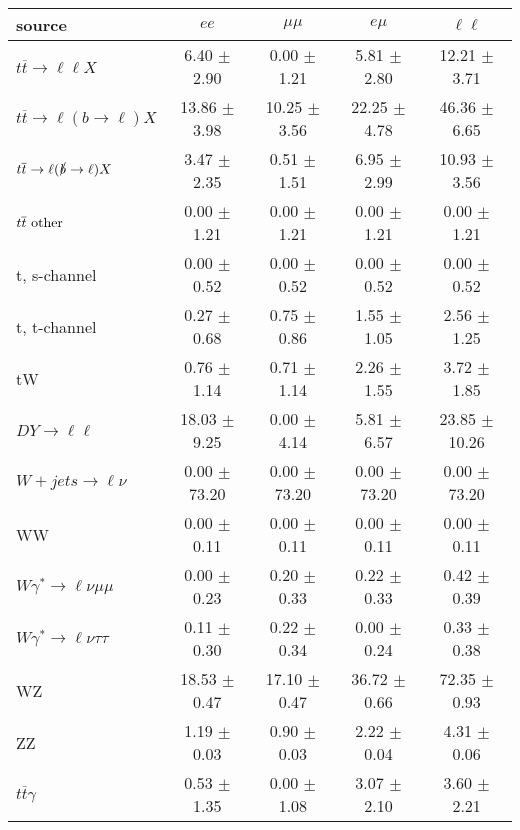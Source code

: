 \begin{tabular}{l|cccc} \hline\hline
source & $ee$ & $\mu\mu$ & $e\mu$ & $\ell\ell $ \\
\hline
$t\overline{t} \rightarrow \ell \ell X$ &  6.40 $\pm$  2.90 &  0.00 $\pm$  1.21 &  5.81 $\pm$  2.80 & 12.21 $\pm$  3.71 \\
$t\overline{t} \rightarrow \ell (b \rightarrow \ell) X$ & 13.86 $\pm$  3.98 & 10.25 $\pm$  3.56 & 22.25 $\pm$  4.78 & 46.36 $\pm$  6.65 \\
$t\overline{t} \rightarrow \ell (\slashed b \rightarrow \ell) X$ &  3.47 $\pm$  2.35 &  0.51 $\pm$  1.51 &  6.95 $\pm$  2.99 & 10.93 $\pm$  3.56 \\
        $t\overline{t}\ \rm{other}$ &  0.00 $\pm$  1.21 &  0.00 $\pm$  1.21 &  0.00 $\pm$  1.21 &  0.00 $\pm$  1.21 \\
\hline
                       t, s-channel &  0.00 $\pm$  0.52 &  0.00 $\pm$  0.52 &  0.00 $\pm$  0.52 &  0.00 $\pm$  0.52 \\
                       t, t-channel &  0.27 $\pm$  0.68 &  0.75 $\pm$  0.86 &  1.55 $\pm$  1.05 &  2.56 $\pm$  1.25 \\
                                 tW &  0.76 $\pm$  1.14 &  0.71 $\pm$  1.14 &  2.26 $\pm$  1.55 &  3.72 $\pm$  1.85 \\
\hline
         $DY \rightarrow \ell \ell$ & 18.03 $\pm$  9.25 &  0.00 $\pm$  4.14 &  5.81 $\pm$  6.57 & 23.85 $\pm$ 10.26 \\
      $W+jets \rightarrow \ell \nu$ &  0.00 $\pm$ 73.20 &  0.00 $\pm$ 73.20 &  0.00 $\pm$ 73.20 &  0.00 $\pm$ 73.20 \\
                                 WW &  0.00 $\pm$  0.11 &  0.00 $\pm$  0.11 &  0.00 $\pm$  0.11 &  0.00 $\pm$  0.11 \\
\hline
$W\gamma^{*} \rightarrow \ell \nu \mu\mu$ &  0.00 $\pm$  0.23 &  0.20 $\pm$  0.33 &  0.22 $\pm$  0.33 &  0.42 $\pm$  0.39 \\
$W\gamma^{*} \rightarrow \ell \nu \tau\tau$ &  0.11 $\pm$  0.30 &  0.22 $\pm$  0.34 &  0.00 $\pm$  0.24 &  0.33 $\pm$  0.38 \\
                                 WZ & 18.53 $\pm$  0.47 & 17.10 $\pm$  0.47 & 36.72 $\pm$  0.66 & 72.35 $\pm$  0.93 \\
                                 ZZ &  1.19 $\pm$  0.03 &  0.90 $\pm$  0.03 &  2.22 $\pm$  0.04 &  4.31 $\pm$  0.06 \\
\hline
              $t\overline{t}\gamma$ &  0.53 $\pm$  1.35 &  0.00 $\pm$  1.08 &  3.07 $\pm$  2.10 &  3.60 $\pm$  2.21 \\

\end{tabular}
